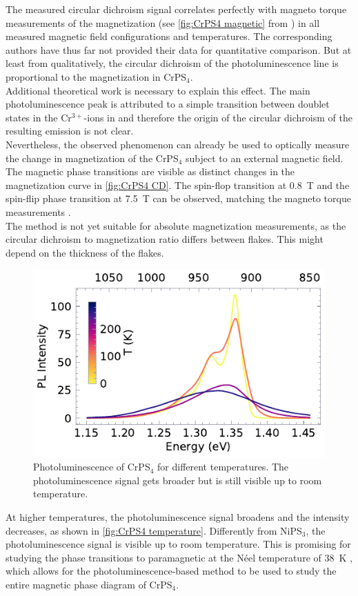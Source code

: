 \documentclass[
	twoside,
	parskip=half,
	a4paper,
]{scrbook}
\begin{document}
The measured circular dichroism signal correlates perfectly with magneto torque measurements of the magnetization (see \autoref{fig:CrPS4 magnetic} from \cite{CrPS4_magnetic}) in all measured magnetic field configurations and temperatures.
The corresponding authors have thus far not provided their data for quantitative comparison.
But at least from qualitatively, the circular dichroism of the photoluminescence line is proportional to the magnetization in CrPS$_4$.\\
Additional theoretical work is necessary to explain this effect.
The main photoluminescence peak is attributed to a simple transition between doublet states in the Cr$^{3+}$-ions in \cite{CrPS4_pl} and therefore the origin of the circular dichroism of the resulting emission is not clear.\\
Nevertheless, the observed phenomenon can already be used to optically measure the change in magnetization of the CrPS$_4$ subject to an external magnetic field.
The magnetic phase transitions are visible as distinct changes in the magnetization curve in \autoref{fig:CrPS4 CD}.
The spin-flop transition at \SI{.8}{T} and the spin-flip phase transition at \SI{7.5}{T} can be observed, matching the magneto torque measurements \cite{CrPS4_magnetic}.\\
The method is not yet suitable for absolute magnetization measurements, as the circular dichroism to magnetization ratio differs between flakes.
This might depend on the thickness of the flakes.


\begin{figure}
	\centering
	\includegraphics{../figures/2024-04-22 CrPS4 temperature series.pdf}
	\caption{Photoluminescence of CrPS$_4$ for different temperatures. The photoluminescence signal gets broader but is still visible up to room temperature.}
	\label{fig:CrPS4 temperature}
\end{figure}
At higher temperatures, the photoluminescence signal broadens and the intensity decreases, as shown in \autoref{fig:CrPS4 temperature}.
Differently from NiPS$_3$, the photoluminescence signal is visible up to room temperature.
This is promising for studying the phase transitions to paramagnetic at the Néel temperature of \SI{38}{K} \cite{CrPS4_magnetic},
which allows for the photoluminescence-based method to be used to study the entire magnetic phase diagram of CrPS$_4$.
\end{document}
